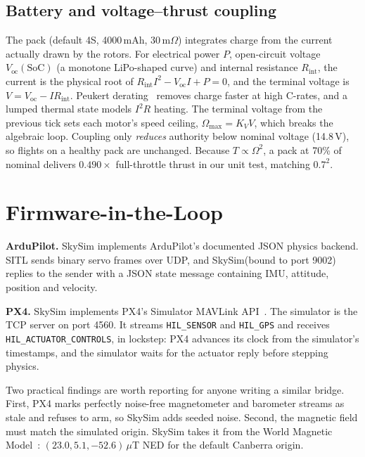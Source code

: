 \documentclass{ieeeaccess}
\newcommand{\skysim}{SkySim\xspace}
\begin{document}
\subsection{Battery and voltage--thrust coupling}
The pack (default 4S, 4000\,mAh, 30\,m$\Omega$) integrates charge from the
current actually drawn by the rotors. For electrical power $P$, open-circuit
voltage $V_\text{oc}(\mathrm{SoC})$ (a monotone LiPo-shaped curve) and internal
resistance $R_\text{int}$, the current is the physical root of
$R_\text{int}I^2 - V_\text{oc}I + P = 0$, and the terminal voltage is
$V=V_\text{oc}-IR_\text{int}$. Peukert derating~\cite{peukert1897} removes charge
faster at high C-rates, and a lumped thermal state models $I^2R$ heating. The
terminal voltage from the previous tick sets each motor's speed ceiling,
$\Omega_\text{max}=K_V V$, which breaks the algebraic loop. Coupling only
\emph{reduces} authority below nominal voltage (14.8\,V), so flights on a
healthy pack are unchanged. Because $T\propto\Omega^2$, a pack at 70\% of
nominal delivers $0.490\times$ full-throttle thrust in our unit test, matching
$0.7^2$.

\section{Firmware-in-the-Loop}
\label{sec:sitl}

\textbf{ArduPilot.} \skysim implements ArduPilot's documented JSON physics
backend. SITL sends binary servo frames over UDP, and \skysim (bound to port
9002) replies to the sender with a JSON state message containing IMU,
attitude, position and velocity.

\textbf{PX4.} \skysim implements PX4's Simulator MAVLink
API~\cite{mavlink}. The simulator is the TCP server on port 4560. It streams
\texttt{HIL\_SENSOR} and \texttt{HIL\_GPS} and receives
\texttt{HIL\_ACTUATOR\_CONTROLS}, in lockstep: PX4 advances its clock from the
simulator's timestamps, and the simulator waits for the actuator reply before
stepping physics.

Two practical findings are worth reporting for anyone writing a similar
bridge. First, PX4 marks perfectly noise-free magnetometer and barometer
streams as stale and refuses to arm, so \skysim adds seeded noise. Second, the
magnetic field must match the simulated origin. \skysim takes it from the World
Magnetic Model~\cite{wmm2025}: $(23.0, 5.1, -52.6)\,\mu$T NED for the default
Canberra origin.
\end{document}
